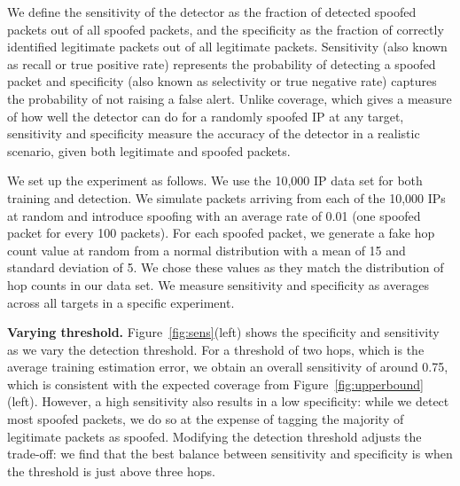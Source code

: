 We define the sensitivity of the detector as the fraction of detected spoofed packets out of all spoofed packets, and the specificity as the fraction of correctly identified legitimate packets out of all legitimate packets. Sensitivity (also known as recall or true positive rate) represents the probability of detecting a spoofed packet and specificity (also known as selectivity or true negative rate) captures the probability of not raising a false alert. Unlike coverage, which gives a measure of how well the detector can do for a randomly spoofed IP at any target, sensitivity and specificity measure the accuracy of the detector in a realistic scenario, given both legitimate and spoofed packets.

We set up the experiment as follows. We use the 10,000 IP data set for both training and detection. We simulate packets arriving from each of the 10,000 IPs at random and introduce spoofing with an average rate of 0.01 (one spoofed packet for every 100 packets). For each spoofed packet, we generate a fake hop count value at random from a normal distribution with a mean of 15 and standard deviation of 5. We chose these values as they match the distribution of hop counts in our data set. We measure sensitivity and specificity as averages across all targets in a specific experiment.




{\bf Varying threshold.} Figure~\ref{fig:sens}(left) shows the specificity and sensitivity as we vary the detection threshold. For a threshold of two hops, which is the average training estimation error, we obtain an overall sensitivity of around 0.75, which is consistent with the expected coverage from Figure~\ref{fig:upperbound}(left). However, a high sensitivity also results in a low specificity: while we detect most spoofed packets, we do so at the expense of tagging the majority of legitimate packets as spoofed. Modifying the detection threshold adjusts the trade-off: we find that the best balance between sensitivity and specificity is when the threshold is just above three hops. 


